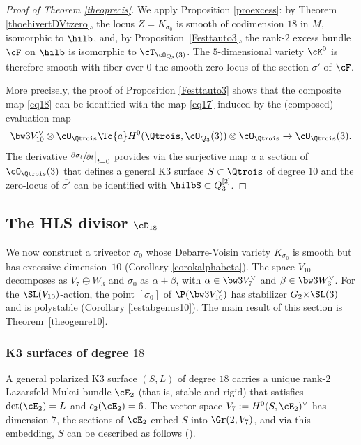 \begin{proof}[Proof of Theorem \ref{theoprecis}]
We apply Proposition \ref{proexcess}:
by Theorem \ref{thoehivertDVtzero},
the locus \hbox{$Z=K_{\sigma_0}$} is smooth of codimension $18$ in $M$, isomorphic to
$\hilb$, and, by Proposition~\ref{Festtauto3}, the rank-$2$ excess
bundle~$\cF $ on $\hilb$ is isomorphic to
$\cT_{\cO_{Q_3}(3)}$. The $5$-dimensional variety $\cK^0$ is therefore smooth
with fiber over $0$ the smooth zero-locus of the
section $\overline {\sigma'} $ of $\cF$.

More precisely, the proof of
Proposition \ref{Festtauto3} shows that the composite
map \eqref{eq18} can be
identified with the map \eqref{eq17}
induced by
the (composed) evaluation map
\[
\bw3V_{10}^\vee\otimes \cO_{\Qtrois}\To{a} H^0(\Qtrois,\cO_{Q_3}(3))\otimes \cO_{\Qtrois}\to \cO_{\Qtrois}(3).
\]
The derivative $\sfrac{\partial\sigma_t}{\partial t}\big\vert_{t=0} $ provides via the surjective map $a$ a section
of $ \cO_{\Qtrois}(3) $ that defines a general K3 surface $S\subset \Qtrois$ of degree $10$ and the zero-locus of $\overline {\sigma'} $ can be identified with $\hilbS\subset Q_3^{[2]}$.
\end{proof}

\subsection{The HLS divisor $\cD_{18}$}\label{secpf10}
We now construct a trivector $\sigma_0$ whose
Debarre-Voisin variety $K_{\sigma_0}$ is smooth but has excessive dimension~$10$ (Corollary \ref{corokalphabeta}). The space $V_{10}$ decomposes as $V_7\oplus W_3$ and
$\sigma_0$ as $\alpha+\beta$, with $\alpha\in \bw3V_7^\vee$ and $\beta\in \bw3W_3^\vee$. For the $\SL(V_{10})$-action, the point $[\sigma_0]$ of $\P(\bw3V_{10}^\vee)$ has stabilizer
$G_2 {\times} \SL(3)$ and is polystable (Corollary \ref{lestabgenus10}). The main result of this section is Theorem~\ref{theogenre10}.

\subsubsection{K3 surfaces of degree $18$}\label{secgenre10}
A general polarized K3 surface $(S,L)$ of degree $18$ carries a unique rank-$2$ Lazarsfeld-Mukai
bundle $\cE_2$ (that is, stable and rigid) that satisfies $\det(\cE_2)=L$ and $c_2(\cE_2)=6$. The vector space
$V_7:=H^0(S,\cE_2 )^\vee$ has dimension $7$, the sections of $\cE_2 $ embed $S$ into $\Gr(2,V_7)$, and
via this embedding, $S$
can be described as follows (\cite{mukai}).

